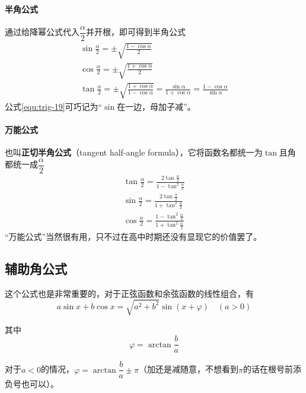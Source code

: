 \paragraph{半角公式}
通过给降幂公式代入$\dfrac{\alpha}{2}$并开根，即可得到半角公式
\begin{gather}
    \sin\frac{\alpha}{2}=\pm\sqrt{\frac{1-\cos\alpha}{2}} \label{equ:trig-17} \\
    \cos\frac{\alpha}{2}=\pm\sqrt{\frac{1+\cos\alpha}{2}} \label{equ:trig-18} \\
    \tan\frac{\alpha}{2}=\pm\sqrt{\frac{1+\cos\alpha}{1-\cos\alpha}}=\frac{\sin\alpha}{1+\cos\alpha}=\frac{1-\cos\alpha}{\sin\alpha} \label{equ:trig-19}
\end{gather}
公式\eqref{equ:trig-19}可巧记为“$\sin$在一边，母加子减”。

\paragraph{万能公式}
也叫\textbf{正切半角公式}（tangent half-angle formula），它将函数名都统一为$\tan$且角都统一成$\dfrac{\alpha}{2}$
\begin{gather}
    \tan\frac{\alpha}{2}=\frac{2\tan\frac{\alpha}{2}}{1-\tan^2\frac{\alpha}{2}} \label{equ:trig-20} \\
    \sin\frac{\alpha}{2}=\frac{2\tan\frac{\alpha}{2}}{1+\tan^2\frac{\alpha}{2}} \label{equ:trig-21} \\
    \cos\frac{\alpha}{2}=\frac{1-\tan^2\frac{\alpha}{2}}{1+\tan^2\frac{\alpha}{2}} \label{equ:trig-22}
\end{gather}
“万能公式”当然很有用，只不过在高中时期还没有显现它的价值罢了。


\subsection{辅助角公式}
这个公式也是非常重要的，对于正弦函数和余弦函数的线性组合，有\[a\sin x+b\cos x=\sqrt{a^2+b^2}\sin(x+\varphi)\quad(a>0)\]

其中\[\varphi=\arctan\frac{b}{a}\]

对于$a<0$的情况，$\varphi=\arctan\dfrac{b}{a}\pm\pi$（加还是减随意，不想看到$\pi$的话在根号前添负号也可以）。

